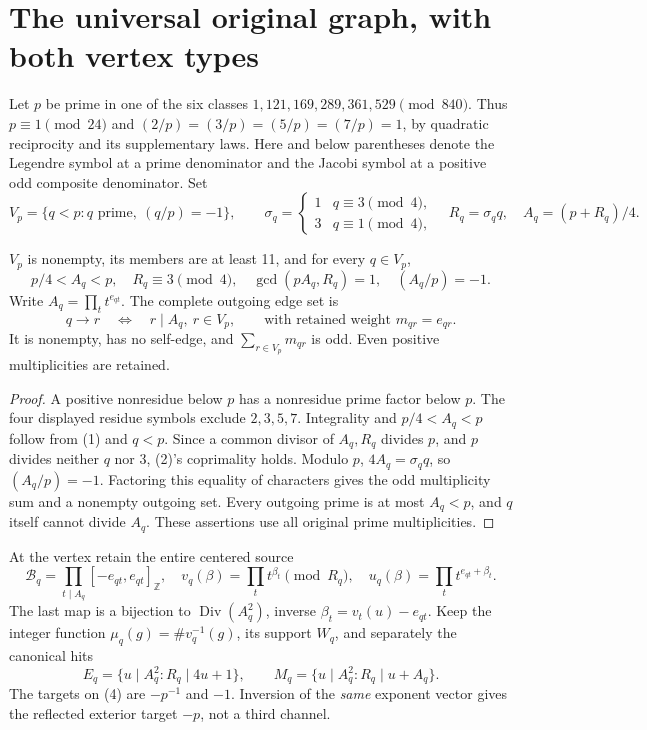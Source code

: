 \section{The universal original graph, with both vertex types}
Let $p$ be prime in one of the six classes
$1,121,169,289,361,529\pmod{840}$. Thus $p\equiv1\pmod{24}$ and
$(2/p)=(3/p)=(5/p)=(7/p)=1$, by quadratic reciprocity and its supplementary laws.
Here and below parentheses denote the Legendre symbol at a prime denominator
and the Jacobi symbol at a positive odd composite denominator.
Set
\[
 V_p=\{q<p:q\text{ prime},\ (q/p)=-1\},\qquad
 \sigma_q=\begin{cases}1&q\equiv3\pmod4,\\3&q\equiv1\pmod4,\end{cases}
 \quad R_q=\sigma_q q,\quad A_q=(p+R_q)/4.                 \tag{1}
\]
\begin{lemma}
$V_p$ is nonempty, its members are at least 11, and for every $q\in V_p$,
\[
 p/4<A_q<p,\quad R_q\equiv3\pmod4,\quad \gcd(pA_q,R_q)=1,
 \quad (A_q/p)=-1.                                      \tag{2}
\]
Write $A_q=\prod_t t^{e_{qt}}$. The complete outgoing edge set is
\[
 q\longrightarrow r\quad\Longleftrightarrow\quad
 r\mid A_q,\ r\in V_p,
 \qquad\text{with retained weight }m_{qr}=e_{qr}.          \tag{3}
\]
It is nonempty, has no self-edge, and
$\sum_{r\in V_p}m_{qr}$ is odd. Even positive multiplicities are retained.
\end{lemma}
\begin{proof}
A positive nonresidue below $p$ has a nonresidue prime factor below $p$.
The four displayed residue symbols exclude $2,3,5,7$.
Integrality and $p/4<A_q<p$ follow from (1) and $q<p$. Since a common divisor
of $A_q,R_q$ divides $p$, and $p$ divides neither $q$ nor $3$, (2)'s coprimality
holds. Modulo $p$, $4A_q=\sigma_q q$, so $(A_q/p)=-1$.
Factoring this equality of characters gives the odd multiplicity sum and a
nonempty outgoing set. Every outgoing prime is at most $A_q<p$, and $q$ itself
cannot divide $A_q$. These assertions use all original prime multiplicities.
\end{proof}

At the vertex retain the entire centered source
\[
 \mathcal B_q=\prod_{t\mid A_q}[-e_{qt},e_{qt}]_{\mathbb Z},\quad
 v_q(\beta)=\prod_t t^{\beta_t}\pmod{R_q},\quad
 u_q(\beta)=\prod_t t^{e_{qt}+\beta_t}.                    \tag{4}
\]
The last map is a bijection to $\operatorname{Div}(A_q^2)$, inverse
$\beta_t=v_t(u)-e_{qt}$. Keep the integer function
$\mu_q(g)=\#v_q^{-1}(g)$, its support $W_q$, and separately the canonical hits
\[
 E_q=\{u\mid A_q^2:R_q\mid4u+1\},\qquad
 M_q=\{u\mid A_q^2:R_q\mid u+A_q\}.                      \tag{5}
\]
The targets on (4) are $-p^{-1}$ and $-1$. Inversion of the \emph{same} exponent
vector gives the reflected exterior target $-p$, not a third channel.

